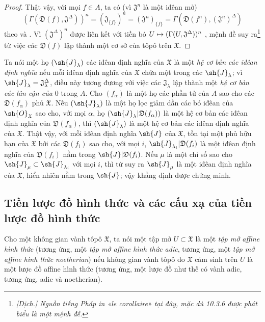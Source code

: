 \documentclass[oneside]{amsart}
\makeatletter
\newcommand{\ega@arrow}[2]{\mathchoice{#1}{#2}{#2}{#2}}
\let\ega@shortmapsto\mapsto
\renewcommand{\mapsto}{\ega@arrow{\longmapsto}{\ega@shortmapsto}}
\newcommand{\oldpage}[2][]{{\marginnote{\normalfont\textbf{#1}~|~#2}}\ignorespaces}
\let\EGAOriginalLabel\label
\renewcommand{\label}[1]{\phantomsection\EGAOriginalLabel{#1}}
\makeatother
\begin{document}
\begin{proof}
Thật vậy, với mọi $f\in A$, ta có (vì $\mathfrak{J}^n$ là một iđêan mở)
\[
  (\Gamma(\mathfrak{D}(f),\mathfrak{J}^\Delta))^n=(\mathfrak{J}_{\{f\}})^n=(\mathfrak{J}^n)_{\{f\}}=\Gamma(\mathfrak{D}(f^n),(\mathfrak{J}^n)^\Delta)
\]
\oldpage[I]{185}
theo  và .
Vì $(\mathfrak{J}^\Delta)^n$ được liên kết với tiền bó $U\mapsto(\Gamma(U,\mathfrak{J}^\Delta))^n$ , mệnh đề suy ra\footnote{\emph{[Dịch.] Nguồn tiếng Pháp in «le corollaire» tại đây, mặc dù 10.3.6 được phát biểu là một mệnh đề.}} từ việc các $\mathfrak{D}(f)$ lập thành một cơ sở của tôpô trên $\mathfrak{X}$.
\end{proof}

\begin{env}[10.3.7]
\label{I.10.3.7}
Ta nói một họ $(\sh{J}_\lambda)$ các iđêan định nghĩa của $\mathfrak{X}$ là một \emph{hệ cơ bản các iđêan định nghĩa} nếu mỗi iđêan định nghĩa của $\mathfrak{X}$ chứa một trong các $\sh{J}_\lambda$; vì $\sh{J}_\lambda=\mathfrak{J}_\lambda^\Delta$, điều này tương đương với việc các $\mathfrak{J}_\lambda$ lập thành một \emph{hệ cơ bản các lân cận của $0$} trong $A$.
Cho $(f_\alpha)$ là một họ các phần tử của $A$ sao cho các $\mathfrak{D}(f_\alpha)$ phủ $\mathfrak{X}$.
Nếu $(\sh{J}_\lambda)$ là một họ lọc giảm dần các bó iđêan của $\sh{O}_\mathfrak{X}$ sao cho, với mọi $\alpha$, họ $(\sh{J}_\lambda|\mathfrak{D}(f_\alpha))$ là một hệ cơ bản các iđêan định nghĩa của $\mathfrak{D}(f_\alpha)$, thì $(\sh{J}_\lambda)$ là một hệ cơ bản các iđêan định nghĩa của $\mathfrak{X}$.
Thật vậy, với mỗi iđêan định nghĩa $\sh{J}$ của $\mathfrak{X}$, tồn tại một phủ hữu hạn của $\mathfrak{X}$ bởi các $\mathfrak{D}(f_i)$ sao cho, với mọi $i$, $\sh{J}_{\lambda_i}|\mathfrak{D}(f_i)$ là một iđêan định nghĩa của $\mathfrak{D}(f_i)$ nằm trong $\sh{J}|\mathfrak{D}(f_i)$.
Nếu $\mu$ là một chỉ số sao cho $\sh{J}_\mu\subset\sh{J}_{\lambda_i}$ với mọi $i$, thì từ  suy ra $\sh{J}_\mu$ là một iđêan định nghĩa của $\mathfrak{X}$, hiển nhiên nằm trong $\sh{J}$; vậy khẳng định được chứng minh.
\end{env}

\subsection{Tiền lược đồ hình thức và các cấu xạ của tiền lược đồ hình thức}
\label{subsection:I.10.4}

\begin{env}[10.4.1]
\label{I.10.4.1}
Cho một không gian vành tôpô $\mathfrak{X}$, ta nói một tập mở $U\subset\mathfrak{X}$ là một \emph{tập mở affine hình thức} (tương ứng, một \emph{tập mở affine hình thức adic}, tương ứng, một \emph{tập mở affine hình thức noetherian}) nếu không gian vành tôpô do $\mathfrak{X}$ cảm sinh trên $U$ là một lược đồ affine hình thức (tương ứng, một lược đồ như thế có vành adic, tương ứng, adic và noetherian).
\end{env}
\end{document}

